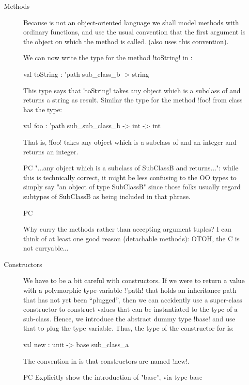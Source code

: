 \documentclass[workingdraft]{usetex-v1}
\begin{document}
\begin{description}
\item[Methods] Because \sml is not an object-oriented language we shall
  model methods with ordinary functions, and use the usual convention
  that the first argument is the object on which the method is called.
  (\gtk also uses this convention).
  
  We can now write the type for the method !toString! in
  :
\begin{SMLcode}
val toString : 'path sub_class_b 
                             -> string
\end{SMLcode}
This type says that !toString! takes any object which is a subclass of
 and returns a string as result.   Similar the
type for the method !foo! from class  has the
type:
\begin{SMLcode}
val foo : 'path sub_sub_class_b 
                         -> int -> int
\end{SMLcode}
That is, !foo! takes any object which is a subclass of
 and an integer and returns an integer.

\begin{ednote}{PC}
  "...any object which is a subclass of SubClassB and
returns...": while this is technically correct, it might be
less confusing to the OO types to simply say "an object of
type SubClassB" since those folks usually regard subtypes of
SubClassB as being included in that phrase.
\end{ednote}

\begin{ednote}{PC}
  
Why curry the methods rather than accepting argument tuples?
I can think of at least one good reason (detachable
methods): OTOH, the C is not curryable...

\end{ednote}

\item[Constructors] We have to be a bit careful with constructors.  If
  we were to return a value with a polymorphic type-variable !'path!
  that holds an inheritance path that has not yet been ``plugged'',
  then we can accidently use a super-class constructor to construct
  values that can be instantiated to the type of a sub-class.  Hence,
  we introduce the abstract dummy type !base! and use that to plug the
  type variable.  Thus, the type of the constructor for
   is:
\begin{SMLcode}
val new : unit -> base sub_class_a
\end{SMLcode}
The convention in \gtk is that constructors are named !new!.

\begin{ednote}{PC}
  Explicitly show the introduction of "base",
via
   type base
\end{ednote}

\end{description}
\end{document}
